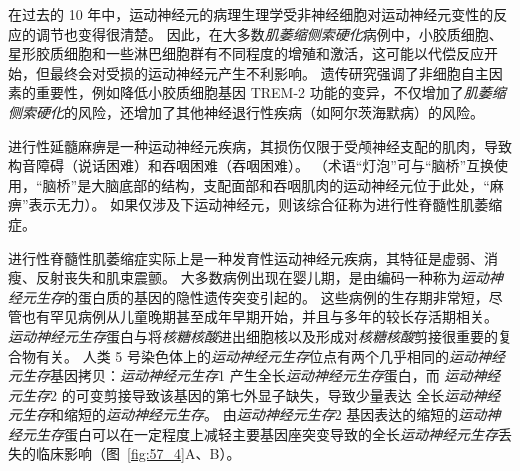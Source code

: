 在过去的 10 年中，运动神经元的病理生理学受非神经细胞对运动神经元变性的反应的调节也变得很清楚。
因此，在大多数\textit{肌萎缩侧索硬化}病例中，小胶质细胞、星形胶质细胞和一些淋巴细胞群有不同程度的增殖和激活，这可能以代偿反应开始，但最终会对受损的运动神经元产生不利影响。
遗传研究强调了非细胞自主因素的重要性，例如降低小胶质细胞基因 TREM-2 功能的变异，不仅增加了\textit{肌萎缩侧索硬化}的风险，还增加了其他神经退行性疾病（如阿尔茨海默病）的风险。


进行性延髓麻痹是一种运动神经元疾病，其损伤仅限于受颅神经支配的肌肉，导致构音障碍（说话困难）和吞咽困难（吞咽困难）。 
（术语“灯泡”可与“脑桥”互换使用，“脑桥”是大脑底部的结构，支配面部和吞咽肌肉的运动神经元位于此处，“麻痹”表示无力）。
如果仅涉及下运动神经元，则该综合征称为进行性脊髓性肌萎缩症。


进行性脊髓性肌萎缩症实际上是一种发育性运动神经元疾病，其特征是虚弱、消瘦、反射丧失和肌束震颤。
大多数病例出现在婴儿期，是由编码一种称为\textit{运动神经元生存}的蛋白质的基因的隐性遗传突变引起的。
这些病例的生存期非常短，尽管也有罕见病例从儿童晚期甚至成年早期开始，并且与多年的较长存活期相关。
\textit{运动神经元生存}蛋白与将\textit{核糖核酸}进出细胞核以及形成对\textit{核糖核酸}剪接很重要的复合物有关。
人类 5 号染色体上的\textit{运动神经元生存}位点有两个几乎相同的\textit{运动神经元生存}基因拷贝：\textit{运动神经元生存}1 产生全长\textit{运动神经元生存}蛋白，而 \textit{运动神经元生存}2 的可变剪接导致该基因的第七外显子缺失，导致少量表达 全长\textit{运动神经元生存}和缩短的\textit{运动神经元生存}。
由\textit{运动神经元生存}2 基因表达的缩短的\textit{运动神经元生存}蛋白可以在一定程度上减轻主要基因座突变导致的全长\textit{运动神经元生存}丢失的临床影响（图~\ref{fig:57_4}A、B）。


